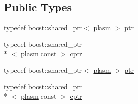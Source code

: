 \subsection*{Public Types}
\begin{DoxyCompactItemize}
\item 
typedef boost\-::shared\-\_\-ptr$<$ \hyperlink{structecto_1_1plasm}{plasm} $>$ \hyperlink{structecto_1_1plasm_a899b9da452ab35849f07038c90990ac3}{ptr}
\item 
typedef boost\-::shared\-\_\-ptr\\*
$<$ \hyperlink{structecto_1_1plasm}{plasm} const  $>$ \hyperlink{structecto_1_1plasm_afd3b9e2d4732023ab9e94553e0d66ac4}{cptr}
\item 
typedef boost\-::shared\-\_\-ptr$<$ \hyperlink{structecto_1_1plasm}{plasm} $>$ \hyperlink{structecto_1_1plasm_a899b9da452ab35849f07038c90990ac3}{ptr}
\item 
typedef boost\-::shared\-\_\-ptr\\*
$<$ \hyperlink{structecto_1_1plasm}{plasm} const  $>$ \hyperlink{structecto_1_1plasm_afd3b9e2d4732023ab9e94553e0d66ac4}{cptr}
\end{DoxyCompactItemize}
